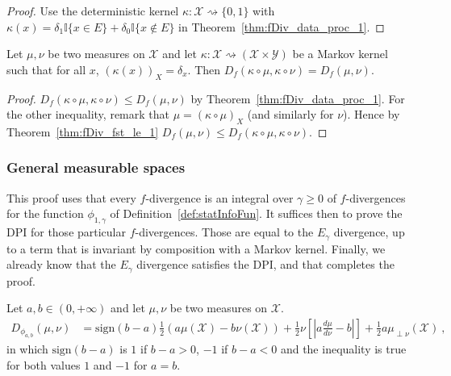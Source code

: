 \begin{proof}
Use the deterministic kernel $\kappa : \mathcal X \rightsquigarrow \{0, 1\}$ with $\kappa(x) = \delta_1 \mathbb{I}\{x \in E\} + \delta_0 \mathbb{I}\{x \notin E\}$ in Theorem~\ref{thm:fDiv_data_proc_1}.
\end{proof}

\begin{lemma}
  \label{lem:fDiv_compProd_prod_eq}
  Let $\mu, \nu$ be two measures on $\mathcal X$ and let $\kappa : \mathcal X \rightsquigarrow (\mathcal X \times \mathcal Y)$ be a Markov kernel such that for all $x$, $(\kappa(x))_X = \delta_x$. Then $D_f(\kappa \circ \mu, \kappa \circ \nu) = D_f(\mu, \nu)$.
\end{lemma}

\begin{proof}
$D_f(\kappa \circ \mu, \kappa \circ \nu) \le D_f(\mu, \nu)$ by Theorem~\ref{thm:fDiv_data_proc_1}.
For the other inequality, remark that $\mu = (\kappa \circ \mu)_X$ (and similarly for $\nu$). Hence by Theorem~\ref{thm:fDiv_fst_le_1} $D_f(\mu, \nu) \le D_f(\kappa \circ \mu, \kappa \circ \nu)$.
\end{proof}




\subsubsection{General measurable spaces}

This proof uses that every $f$-divergence is an integral over $\gamma \ge 0$ of $f$-divergences for the function $\phi_{1,\gamma}$ of Definition~\ref{def:statInfoFun}. It suffices then to prove the DPI for those particular $f$-divergences. Those are equal to the $E_\gamma$ divergence, up to a term that is invariant by composition with a Markov kernel. Finally, we already know that the $E_\gamma$ divergence satisfies the DPI, and that completes the proof.

\begin{lemma}
  \label{lem:fDiv_statInfoFun_eq}
  \leanok
  Let $a,b \in (0, +\infty)$ and let $\mu, \nu$ be two measures on $\mathcal X$.
  \begin{align*}
  D_{\phi_{a,b}}(\mu, \nu)
  &= \text{sign}(b-a)\frac{1}{2}(a \mu(\mathcal X) - b \nu(\mathcal X)) + \frac{1}{2}\nu\left[ \left\vert a \frac{d\mu}{d\nu} - b \right\vert \right] + \frac{1}{2}a \mu_{\perp \nu}(\mathcal X)
  \: ,
  \end{align*}
  in which $\text{sign}(b-a)$ is $1$ if $b-a > 0$, $-1$ if $b-a < 0$ and the inequality is true for both values $1$ and $-1$ for $a=b$.
\end{lemma}

